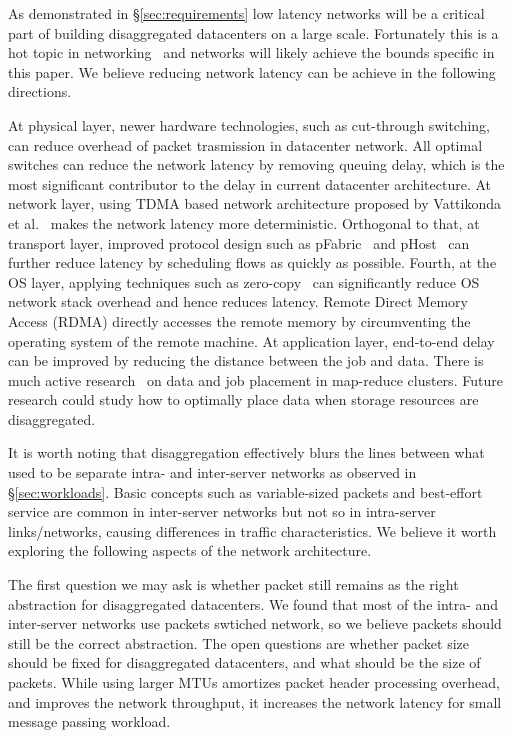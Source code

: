 As demonstrated in \S\ref{sec:requirements} low latency networks will be a critical part of building  disaggregated datacenters on a large scale. Fortunately this is a hot topic in networking~\cite{lowlatency} and networks will likely achieve the bounds specific in this paper.
We believe reducing network latency can be achieve in the following directions.

At physical layer, newer hardware technologies, such as cut-through switching, can reduce overhead of packet trasmission in datacenter network. All optimal switches can reduce the network latency by removing queuing delay, which is the most significant contributor to the delay in current datacenter architecture.
At network layer, using TDMA based network architecture proposed by Vattikonda et al.~\cite{tdma} makes the network latency more deterministic. 
Orthogonal to that, at transport layer, improved protocol design such as pFabric~\cite{pfabric} and pHost~\cite{phost} can further reduce latency by scheduling flows as quickly as possible. 
Fourth, at the OS layer, applying techniques such as zero-copy~\cite{netmap} can significantly reduce OS network stack overhead and hence reduces latency.
Remote Direct Memory Access (RDMA) directly accesses the remote memory by circumventing the operating system of the remote machine.
At application layer, end-to-end delay can be improved by reducing the distance between the job and data. There is much active research~\cite{endpoint} on data and job placement in map-reduce clusters. Future research could study how to optimally place data when storage resources are disaggregated.

It is worth noting that disaggregation effectively blurs the lines between what used to be separate intra- and inter-server networks as observed in \S\ref{sec:workloads}. 
Basic concepts such as variable-sized packets and best-effort service are common in inter-server networks but not so in intra-server links/networks, causing differences in traffic characteristics. 
We believe it worth exploring the following aspects of the network architecture.

The first question we may ask is whether packet still remains as the right abstraction for disaggregated datacenters. 
We found that most of the intra- and inter-server networks use packets swtiched network, so we believe packets should still be the correct abstraction. 
The open questions are whether packet size should be fixed for disaggregated datacenters, and what should be the size of packets. 
While using larger MTUs amortizes packet header processing overhead, and improves the network throughput, it increases the network latency for small message passing workload.

